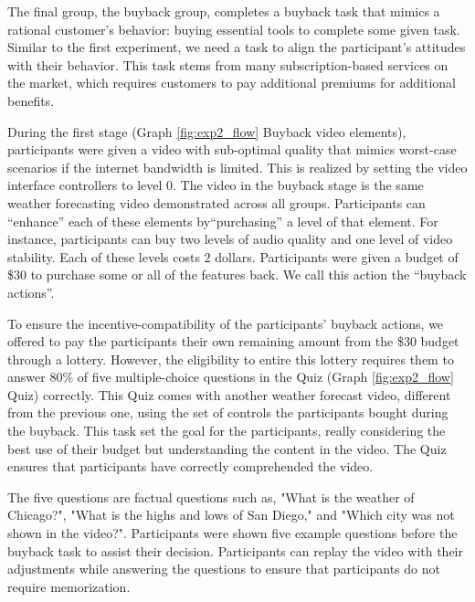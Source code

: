 The final group, the buyback group, completes a buyback task that mimics a rational customer's behavior:  buying essential tools to complete some given task.
Similar to the first experiment, we need a task to align the participant's attitudes with their behavior.
This task stems from many subscription-based services on the market, which requires customers to pay additional premiums for additional benefits.

During the first stage (Graph \ref{fig:exp2_flow} Buyback video elements), participants were given a video with sub-optimal quality that mimics worst-case scenarios if the internet bandwidth is limited. 
This is realized by setting the video interface controllers to level 0.
The video in the buyback stage is the same weather forecasting video demonstrated across all groups.
Participants can ``enhance'' each of these elements by``purchasing'' a level of that element. 
For instance, participants can buy two levels of audio quality and one level of video stability.
Each of these levels costs $2$ dollars. 
Participants were given a budget of \$30 to purchase some or all of the features back.
We call this action the ``buyback actions''.

To ensure the incentive-compatibility of the participants' buyback actions, we offered to pay the participants their own remaining amount from the \$30 budget through a lottery.
However, the eligibility to entire this lottery requires them to answer 80\% of five multiple-choice questions in the Quiz (Graph \ref{fig:exp2_flow} Quiz) correctly.
This Quiz comes with another weather forecast video, different from the previous one, using the set of controls the participants bought during the buyback.
This task set the goal for the participants, really considering the best use of their budget but understanding the content in the video.
The Quiz ensures that participants have correctly comprehended the video.

The five questions are factual questions such as, "What is the weather of Chicago?", "What is the highs and lows of San Diego," and "Which city was not shown in the video?". 
Participants were shown five example questions before the buyback task to assist their decision.
Participants can replay the video with their adjustments while answering the questions to ensure that participants do not require memorization.\par
